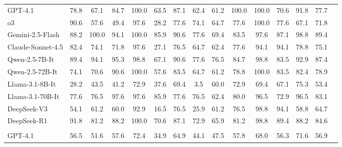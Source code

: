 \documentclass[sigconf]{acmart}
\begin{document}
\begin{table}[!t]
\begin{adjustbox}{width=0.95\linewidth}
\begin{tabular}{lcccccccccccccc}
GPT-4.1 & 78.8 & 67.1 & 84.7 & \cellcolor{green!20}100.0 & 63.5 & 87.1 & 62.4 & 61.2 & \cellcolor{green!20}100.0 & \cellcolor{green!20}100.0 & 70.6 & 91.8 & 77.7 \\
o3 & 90.6 & 57.6 & 49.4 & 97.6 & 28.2 & 77.6 & 74.1 & 64.7 & 77.6 & \cellcolor{green!20}100.0 & 77.6 & 67.1 & 71.8 \\
Gemini-2.5-Flash & 88.2 & \cellcolor{green!20}100.0 & 94.1 & \cellcolor{green!20}100.0 & \cellcolor{green!20}85.9 & \cellcolor{green!20}90.6 & \cellcolor{green!20}77.6 & 69.4 & 83.5 & 97.6 & 87.1 & \cellcolor{green!20}98.8 & \cellcolor{green!20}89.4 \\
Claude-Sonnet-4.5 & 82.4 & 74.1 & 71.8 & 97.6 & 27.1 & 76.5 & 64.7 & 62.4 & 77.6 & 94.1 & \cellcolor{green!20}94.1 & 78.8 & 75.1 \\
Qwen-2.5-7B-It & 89.4 & 94.1 & 95.3 & 98.8 & 67.1 & \cellcolor{green!20}90.6 & \cellcolor{green!20}77.6 & \cellcolor{green!20}76.5 & 84.7 & 98.8 & 83.5 & 92.9 & 87.4 \\
Qwen-2.5-72B-It & 74.1 & 70.6 & 90.6 & \cellcolor{green!20}100.0 & 57.6 & 83.5 & 64.7 & 61.2 & 78.8 & \cellcolor{green!20}100.0 & 83.5 & 82.4 & 78.9 \\
Llama-3.1-8B-It & \cellcolor{red!20}28.2 & \cellcolor{red!20}43.5 & \cellcolor{red!20}41.2 & \cellcolor{red!20}72.9 & 37.6 & \cellcolor{red!20}69.4 & \cellcolor{red!20}3.5 & \cellcolor{red!20}60.0 & \cellcolor{red!20}72.9 & \cellcolor{red!20}69.4 & \cellcolor{red!20}67.1 & 75.3 & \cellcolor{red!20}53.4 \\
Llama-3.1-70B-It & 77.6 & 76.5 & \cellcolor{green!20}97.6 & 97.6 & \cellcolor{green!20}85.9 & 77.6 & 76.5 & 62.4 & 80.0 & 96.5 & 72.9 & 96.5 & 83.1 \\
DeepSeek-V3 & 54.1 & 61.2 & 60.0 & 92.9 & \cellcolor{red!20}16.5 & 76.5 & 25.9 & 61.2 & 76.5 & 98.8 & \cellcolor{green!20}94.1 & \cellcolor{red!20}58.8 & 64.7 \\
DeepSeek-R1 & \cellcolor{green!20}91.8 & 81.2 & 88.2 & \cellcolor{green!20}100.0 & 70.6 & 87.1 & 72.9 & 65.9 & 81.2 & 98.8 & 89.4 & 88.2 & 84.6 \\

\midrule
\rowcolor{orange!10} \multicolumn{14}{c}{\textit{\textbf{Turn = 2}}} \\ \midrule



GPT-4.1 & 56.5 & 51.6 & 57.6 & 72.4 & 34.9 & \cellcolor{green!20}64.9 & 44.1 & 47.5 & 57.8 & 68.0 & 56.3 & 71.6 & 56.9 \\


\end{tabular}
\end{adjustbox}
\end{table}
\end{document}
